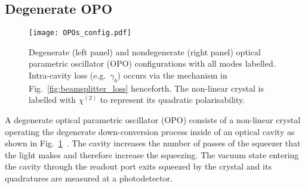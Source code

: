 \subsection{Degenerate OPO}

\begin{figure}
	\centering
	\texttt{[image: OPOs\_config.pdf]}
	\caption{Degenerate (left panel) and nondegenerate (right panel) optical parametric oscillator (OPO) configurations with all modes labelled. Intra-cavity loss (e.g.\ $\gamma_b$) occurs via the mechanism in Fig.~\ref{fig:beamsplitter_loss} henceforth. The non-linear crystal is labelled with $\chi^{(2)}$ to represent its quadratic polarisability. %
	}
	\label{fig:OPOs_config}
\end{figure}

A degenerate optical parametric oscillator (OPO) consists of a non-linear crystal operating the degenerate down-conversion process inside of an optical cavity as shown in Fig.~\ref{fig:OPOs_config}~\cite{PhysRevA.30.1386}. The cavity increases the number of passes of the squeezer that the light makes and therefore increase the squeezing. The vacuum state entering the cavity through the readout port exits squeezed by the crystal and its quadratures are measured at a photodetector.

